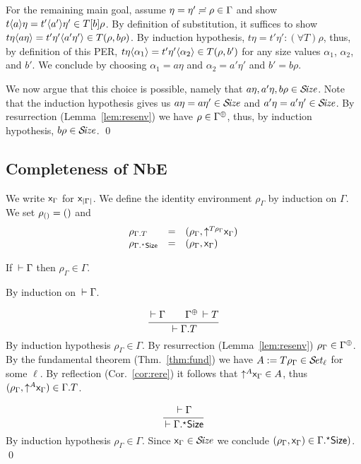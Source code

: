 \documentclass[acmlarge,review,anonymous]{acmart}\settopmatter{printfolios=true}
\makeatletter
\newenvironment{proof*}[1][\proofname]{\par
  \normalfont \topsep6\p@\@plus6\p@\relax
  \trivlist
  \item[\@proofindent\hskip\labelsep
        {\@proofnamefont #1\@addpunct{.}}]\ignorespaces
}{%
  \endtrivlist\@endpefalse
}
\makeatother
\begin{document}
\begin{proof*}
\begin{caselist}
For the remaining main goal,
assume $\eta = \eta' \eeq \rho \in \Gamma$ and
show $t \ann a \eta = t' \ann{a'} \eta' \in T[b]\rho$.
By definition of substitution, it suffices to show
$t \eta \ann{a \eta} = t' \eta' \ann{a' \eta'} \in T(\rho, b \rho)$.
By induction hypothesis,
$t \eta = t' \eta' : (\forall T) \rho$, thus, by definition of this PER,
$t \eta \ann {\alpha_1} = t' \eta' \ann{\alpha_2} \in T(\rho, b')$ for any size values $\alpha_1$, $\alpha_2$, and $b'$.
We conclude by choosing $\alpha_1 = a \eta$ and $\alpha_2 = a' \eta'$ and $b' = b \rho$.

We now argue that this choice is possible,
namely that $a \eta, a'\eta, b\rho \in \SIZE$.
Note that the induction hypothesis gives us
$a \eta  = a  \eta' \in \SIZE$ and
$a' \eta = a' \eta' \in \SIZE$.
By resurrection (Lemma~\ref{lem:resenv}) we have $\rho \in \resurrect\Gamma$,
thus, by induction hypothesis, $b \rho \in \SIZE$.
\qed
\end{caselist}
\end{proof*}


\subsection{Completeness of NbE}
\label{sec:compl}

We write $\var\Gamma$ for $\var{|\Gamma|}$.
We define the identity environment $\rho_\Gamma$ by induction on $\Gamma$.
We set $\rho_{\cempty} = \sempty$ and
\[
\begin{array}{lll}
  \rho_{\cext \Gamma T} & = & (\rho_\Gamma, \up{T\rho_\Gamma} \var\Gamma) \\
  \rho_{\eext \Gamma \Size} & = & (\rho_\Gamma, \var\Gamma) \\
\end{array}
\]
\begin{lemma}
  If\/ $\der \Gamma$ then
  $\rho_\Gamma \in \Gamma$.
\end{lemma}
\begin{proof*}
By induction on $\der \Gamma$.
\begin{caselist}

\nextcase
\[
  \ru{\der \Gamma \qquad \resurrect\Gamma \der T
    }{\der \cext\Gamma T}
\]
By induction hypothesis $\rho_\Gamma \in \Gamma$.
By resurrection (Lemma~\ref{lem:resenv}) $\rho_\Gamma \in \resurrect\Gamma$.
By the fundamental theorem (Thm.~\ref{thm:fund}) we have $A := T\rho_\Gamma \in \SET[\ell]$ for some $\ell$.
By reflection (Cor.~\ref{cor:rere}) it follows that $\up A \var\Gamma \in A$, thus
$(\rho_\Gamma, \up A \var\Gamma) \in \cext \Gamma T$.

\nextcase
\[
  \ru{\der \Gamma
    }{\der \eext\Gamma \Size}
\]
By induction hypothesis $\rho_\Gamma \in \Gamma$.  Since $\var\Gamma \in \SIZE$ we conclude
$(\rho_\Gamma, \var\Gamma) \in \eext\Gamma \Size)$.
\qed
\end{caselist}
\end{proof*}
\end{document}
